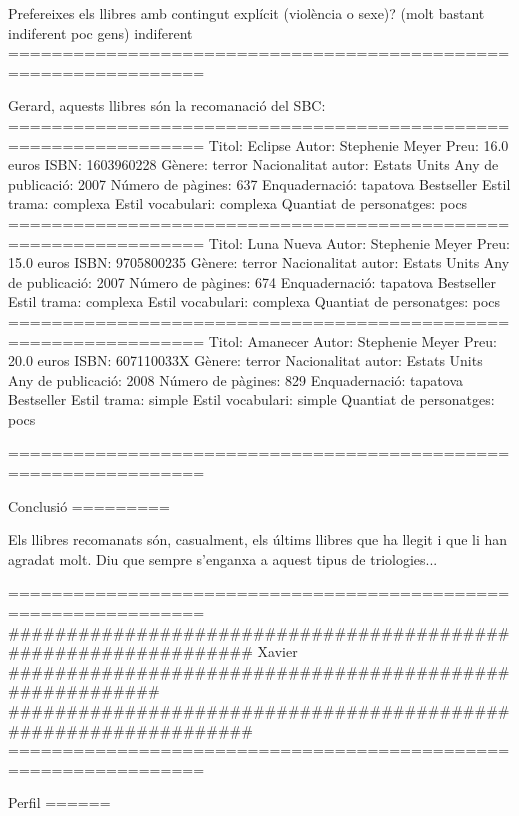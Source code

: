 Prefereixes els llibres amb contingut explícit (violència o sexe)? (molt bastant indiferent poc gens) indiferent
================================================================

Gerard, 
aquests llibres són la recomanació del SBC: 
================================================================
Titol:                   Eclipse
Autor:                   Stephenie Meyer
Preu:                    16.0 euros
ISBN:                    1603960228
Gènere:                  terror
Nacionalitat autor:      Estats Units
Any de publicació:       2007
Número de pàgines:       637
Enquadernació:           tapatova
Bestseller
Estil trama:             complexa
Estil vocabulari:        complexa
Quantiat de personatges: pocs
================================================================
Titol:                   Luna Nueva
Autor:                   Stephenie Meyer
Preu:                    15.0 euros
ISBN:                    9705800235
Gènere:                  terror
Nacionalitat autor:      Estats Units
Any de publicació:       2007
Número de pàgines:       674
Enquadernació:           tapatova
Bestseller
Estil trama:             complexa
Estil vocabulari:        complexa
Quantiat de personatges: pocs
================================================================
Titol:                   Amanecer
Autor:                   Stephenie Meyer
Preu:                    20.0 euros
ISBN:                    607110033X
Gènere:                  terror
Nacionalitat autor:      Estats Units
Any de publicació:       2008
Número de pàgines:       829
Enquadernació:           tapatova
Bestseller
Estil trama:             simple
Estil vocabulari:        simple
Quantiat de personatges: pocs

================================================================

Conclusió
=========

Els llibres recomanats són, casualment, els últims llibres que ha llegit i que li han agradat molt. Diu que sempre s'enganxa a aquest tipus de triologies...



================================================================
################################################################
Xavier  ########################################################
################################################################
================================================================

Perfil
======

